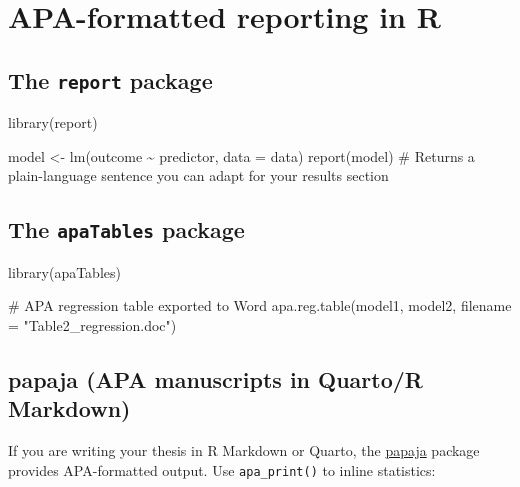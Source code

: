 \documentclass[
  11pt,
  a4paper,
]{scrbook}
\newenvironment{Shaded}{\begin{snugshade}}{\end{snugshade}}
\newcommand{\AttributeTok}[1]{\textcolor[rgb]{0.40,0.45,0.13}{#1}}
\newcommand{\CommentTok}[1]{\textcolor[rgb]{0.37,0.37,0.37}{#1}}
\newcommand{\FunctionTok}[1]{\textcolor[rgb]{0.28,0.35,0.67}{#1}}
\newcommand{\NormalTok}[1]{\textcolor[rgb]{0.00,0.23,0.31}{#1}}
\newcommand{\OtherTok}[1]{\textcolor[rgb]{0.00,0.23,0.31}{#1}}
\newcommand{\SpecialCharTok}[1]{\textcolor[rgb]{0.37,0.37,0.37}{#1}}
\newcommand{\StringTok}[1]{\textcolor[rgb]{0.13,0.47,0.30}{#1}}
\begin{document}
\section{APA-formatted reporting in
R}\label{apa-formatted-reporting-in-r}

\subsection{\texorpdfstring{The \texttt{report}
package}{The report package}}\label{the-report-package}

\begin{Shaded}
\begin{Highlighting}[]
\FunctionTok{library}\NormalTok{(report)}

\NormalTok{model }\OtherTok{\textless{}{-}} \FunctionTok{lm}\NormalTok{(outcome }\SpecialCharTok{\textasciitilde{}}\NormalTok{ predictor, }\AttributeTok{data =}\NormalTok{ data)}
\FunctionTok{report}\NormalTok{(model)}
\CommentTok{\# Returns a plain{-}language sentence you can adapt for your results section}
\end{Highlighting}
\end{Shaded}

\subsection{\texorpdfstring{The \texttt{apaTables}
package}{The apaTables package}}\label{the-apatables-package}

\begin{Shaded}
\begin{Highlighting}[]
\FunctionTok{library}\NormalTok{(apaTables)}

\CommentTok{\# APA regression table exported to Word}
\FunctionTok{apa.reg.table}\NormalTok{(model1, model2,}
              \AttributeTok{filename =} \StringTok{"Table2\_regression.doc"}\NormalTok{)}
\end{Highlighting}
\end{Shaded}

\subsection{papaja (APA manuscripts in Quarto/R
Markdown)}\label{papaja-apa-manuscripts-in-quartor-markdown}

If you are writing your thesis in R Markdown or Quarto, the
\href{https://frederikaust.com/papaja_man/}{papaja} package provides
APA-formatted output. Use \texttt{apa\_print()} to inline statistics:
\end{document}
